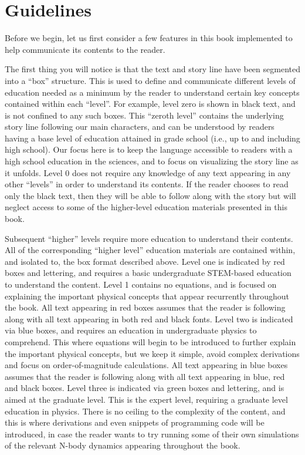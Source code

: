 \documentclass[main.tex]{subfiles}
\begin{document}
\section{Guidelines} \label{guide}

\par \nar Before we begin, let us first consider a few features in this book implemented to help communicate its contents to the reader.  


\par \nar The first thing you will notice is that the text and story line have been segmented into a “box” structure.  This is used to define and communicate different levels of education needed as a minimum by the reader to understand certain key concepts contained within each “level”.  For example, level zero is shown in black text, and is not confined to any such boxes.  This “zeroth level” contains the underlying story line following our main characters, and can be understood by readers having a base level of education attained in grade school (i.e., up to and including high school).  Our focus here is to keep the language accessible to readers with a high school education in the sciences, and to focus on visualizing the story line as it unfolds.  Level 0 does not require any knowledge of any text appearing in any other “levels” in order to understand its contents.  If the reader chooses to read only the black text, then they will be able to follow along with the story but will neglect access to some of the higher-level education materials presented in this book.  

\par \nar Subsequent “higher” levels require more education to understand their contents.  All of the corresponding “higher level” education materials are contained within, and isolated to, the box format described above.  Level one is indicated by red boxes and lettering, and requires a basic undergraduate STEM-based education to understand the content.  Level 1 contains no equations, and is focused on explaining the important physical concepts that appear recurrently throughout the book.  All text appearing in red boxes assumes that the reader is following along with all text appearing in both red and black fonts.  Level two is indicated via blue boxes, and requires an education in undergraduate physics to comprehend.  This where equations will begin to be introduced to further explain the important physical concepts, but we keep it simple, avoid complex derivations and focus on order-of-magnitude calculations.  All text appearing in blue boxes assumes that the reader is following along with all text appearing in blue, red and black boxes.  Level three is indicated via green boxes and lettering, and is aimed at the graduate level.  This is the expert level, requiring a graduate level education in physics.  There is no ceiling to the complexity of the content, and this is where derivations and even snippets of programming code will be introduced, in case the reader wants to try running some of their own simulations of the relevant N-body dynamics appearing throughout the book.  %
\end{document}
